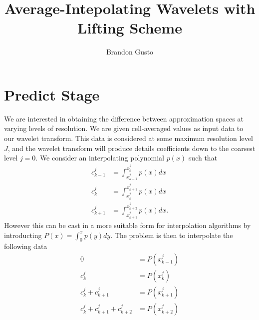 \documentclass[10.5pt]{article}
\begin{document}
\title{Average-Intepolating Wavelets with Lifting Scheme}
\author{Brandon Gusto}
\maketitle

\section*{Predict Stage}
We are interested in obtaining the difference between approximation spaces at varying levels of resolution. We are given cell-averaged
values as input data to our wavelet transform. This data is considered at some maximum resolution level $J$, and the wavelet transform
will produce details coefficients down to the coarsest level $j=0$. We consider an interpolating polynomial $p(x)$ such that
\begin{align}
    c^{j}_{k-1} &= \int_{x^{j}_{k-1}}^{x^{j}_{k}} p(x) dx \\
    c^{j}_{k} &= \int_{x^{j}_{k}}^{x^{j}_{k+1}} p(x) dx \\
    c^{j}_{k+1} &= \int_{x^{j}_{k+1}}^{x^{j}_{k+2}} p(x) dx.
\end{align}
However this can be cast in a more suitable form for interpolation algorithms by introducting $P(x) = \int_{0}^{x} p(y) dy$. The
problem is then to interpolate the following data
\begin{align}
    0 &= P(x^{j}_{k-1}) \\
    c^{j}_{k} &= P(x^{j}_{k}) \\
    c^{j}_{k} + c^{j}_{k+1} &= P(x^{j}_{k+1}) \\
    c^{j}_{k} + c^{j}_{k+1} + c^{j}_{k+2} &= P(x^{j}_{k+2}) \\
\end{align}
\end{document}
